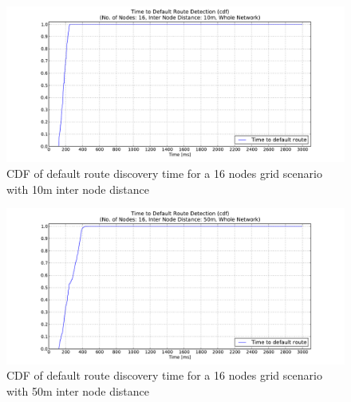 \begin{figure}[htbp]
  \begin{center}
  \hspace{-20pt}
    \leavevmode
      \includegraphics[width=\textwidth]
      {Pics/results/16/MRHOF/grid/dist10_montecarlo_cdf_hist.pdf}
   \caption{CDF of default route discovery time for a 16 nodes grid scenario with 10m inter node distance}
   \label{fig:16_MRHOF_grid_10_cdf}
  \end{center}
  \vspace{-10pt}
\end{figure}

\begin{figure}[htbp]
  \begin{center}
  \hspace{-20pt}
    \leavevmode
      \includegraphics[width=\textwidth]
      {Pics/results/16/MRHOF/grid/dist50_montecarlo_cdf_hist.pdf}
   \caption{CDF of default route discovery time for a 16 nodes grid scenario with 50m inter node distance}
   \label{fig:16_MRHOF_grid_50_cdf}
  \end{center}
  \vspace{-10pt}
\end{figure}

